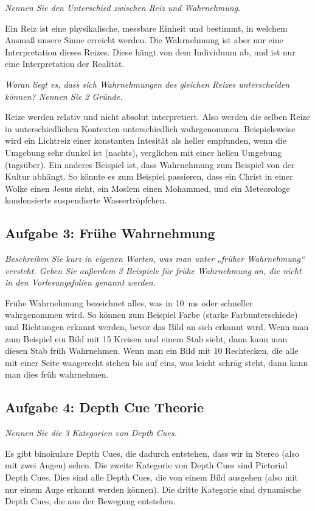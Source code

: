 \documentclass[
  ngerman,
  DIV=14
]{scrartcl}
\begin{document}
\bigskip\noindent
\emph{Nennen Sie den Unterschied zwischen Reiz und Wahrnehmung.}
\par\medskip\noindent
Ein Reiz ist eine physikalische, messbare Einheit und bestimmt, in welchem Ausmaß unsere Sinne erreicht werden. Die Wahrnehmung ist aber nur eine Interpretation dieses Reizes. Diese hängt von dem Individuum ab, und ist nur eine Interpretation der Realität.

\bigskip\noindent
\emph{Woran liegt es, dass sich Wahrnehmungen des gleichen Reizes unterscheiden können? Nennen Sie 2 Gründe.}
\par\medskip\noindent
Reize werden relativ und nicht absolut interpretiert. Also werden die selben Reize in unterschiedlichen Kontexten unterschiedlich wahrgenommen. Beispielsweise wird ein Lichtreiz einer konstanten Intesität als heller empfunden, wenn die Umgebung sehr dunkel ist (nachts), verglichen mit einer hellen Umgebung (tagsüber). Ein anderes Beispiel ist, dass Wahrnehmung zum Beispiel von der Kultur abhängt. So könnte es zum Beispiel passieren, dass ein Christ in einer Wolke einen Jesus sieht, ein Moslem einen Mohammed, und ein Meteorologe kondensierte suspendierte Wassertröpfchen.

\subsection*{Aufgabe 3: Frühe Wahrnehmung}
\emph{Beschreiben Sie kurz in eigenen Worten, was man unter „früher Wahrnehmung“ versteht. Geben Sie außerdem 3 Beispiele für frühe Wahrnehmung an, die nicht in den Vorlesungsfolien genannt werden.}
\par\medskip\noindent
Frühe Wahrnehmung bezeichnet alles, was in \SI{10}{\milli\second} oder schneller wahrgenommen wird. So können zum Beispiel Farbe (starke Farbunterschiede) und Richtungen erkannt werden, bevor das Bild an sich erkannt wird. Wenn man zum Beispiel ein Bild mit 15 Kreisen und einem Stab sieht, dann kann man diesen Stab früh Wahrnehmen. Wenn man ein Bild mit 10 Rechtecken, die alle mit einer Seite waagerecht stehen bis auf eins, was leicht schräg steht, dann kann man dies früh wahrnehmen. 

\subsection*{Aufgabe 4: Depth Cue Theorie}
\emph{Nennen Sie die 3 Kategorien von Depth Cues.}
\par\medskip\noindent
Es gibt binokulare Depth Cues, die dadurch entstehen, dass wir in Stereo (also mit zwei Augen) sehen. Die zweite Kategorie von Depth Cues sind Pictorial Depth Cues. Dies sind alle Depth Cues, die von einem Bild ausgehen (also mit nur einem Auge erkannt werden können). Die dritte Kategorie sind dynamische Depth Cues, die aus der Bewegung entstehen.
\end{document}
